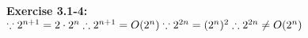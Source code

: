 \documentclass{article}
\begin{document}
\begin{spacing}{2.0}
\noindent
\textbf{Exercise 3.1-4:}\\
$
\because 2 ^ {n + 1} = 2 \cdot 2 ^ n\\
\therefore 2 ^ {n + 1} = O(2 ^ n)\\
\because 2 ^ {2n} = (2 ^ n) ^ 2\\
\therefore 2 ^ {2n} \ne O(2 ^ n)\\
$
\end{spacing}
\end{document}
